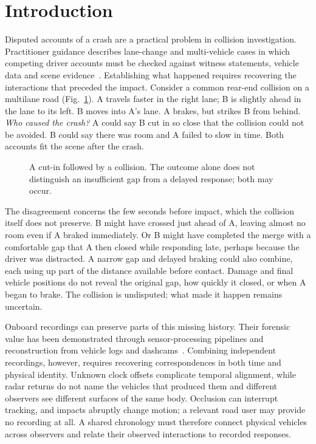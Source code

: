 \section{Introduction}
\label{sec:introduction}

Disputed accounts of a crash are a practical problem in collision
investigation. Practitioner guidance describes lane-change and
multi-vehicle cases in which competing driver accounts must be checked
against witness statements, vehicle data and scene
evidence~\cite{maier2026threecar,daviskelin2024unclear}. Establishing what
happened requires recovering the interactions that preceded the impact.
Consider a common rear-end collision on a multilane road
(Fig.~\ref{fig:cut-in-example}). A travels faster in the right lane; B is
slightly ahead in the lane to its left. B moves into A's lane. A brakes,
but strikes B from behind. \emph{Who caused the crash?} A could say B cut in
so close that the collision could not be avoided. B could say there was
room and A failed to slow in time. Both accounts fit the scene after the crash.

\begin{figure}[!h]
  \centering
  
  \caption{A cut-in followed by a collision. The outcome alone does not
  distinguish an insufficient gap from a delayed response; both may occur.}
  \label{fig:cut-in-example}
\end{figure}

The disagreement concerns the few seconds before impact, which the collision
itself does not preserve. B might have crossed just ahead of A, leaving
almost no room even if A braked immediately. Or B might have completed the
merge with a comfortable gap that A then closed while responding late,
perhaps because the driver was distracted. A narrow gap and delayed braking
could also combine, each using up part of the distance available before
contact. Damage and final vehicle positions do
not reveal the original gap, how quickly it closed, or when A began to brake.
The collision is undisputed; what made it happen remains uncertain.

Onboard recordings can preserve parts of this missing history. Their
forensic value has been demonstrated through sensor-processing pipelines
and reconstruction from vehicle logs and
dashcams~\cite{beck2023pipeline,matsumura2024precrash}. Combining
independent recordings, however, requires recovering correspondences in
both time and physical identity. Unknown clock offsets complicate temporal
alignment, while radar returns do not name the vehicles that produced
them and different observers see different surfaces of the same body.
Occlusion can interrupt tracking, and impacts abruptly change
motion; a relevant road user may provide no recording at all. A shared
chronology must therefore connect
physical vehicles across observers and relate their observed
interactions to recorded responses.

